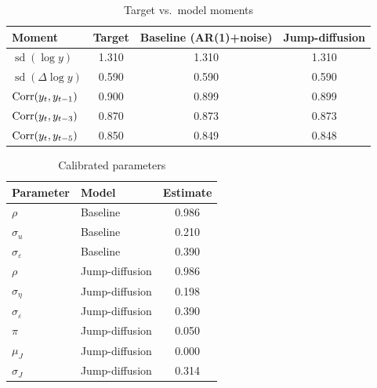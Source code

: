 
\begin{table}[H]
\centering
\caption{Target vs.\ model moments}
\label{tab:problem3-moments}
\begin{tabular}{lccc}
\toprule
Moment & Target & Baseline (AR(1)+noise) & Jump-diffusion \\
\midrule
$\operatorname{sd}(\log y)$ & 1.310 & 1.310 & 1.310 \\
$\operatorname{sd}(\Delta \log y)$ & 0.590 & 0.590 & 0.590 \\
$\operatorname{Corr}(y_t, y_{t-1})$ & 0.900 & 0.899 & 0.899 \\
$\operatorname{Corr}(y_t, y_{t-3})$ & 0.870 & 0.873 & 0.873 \\
$\operatorname{Corr}(y_t, y_{t-5})$ & 0.850 & 0.849 & 0.848 \\
\bottomrule
\end{tabular}
\end{table}

\begin{table}[H]
\centering
\caption{Calibrated parameters}
\label{tab:problem3-parameters}
\begin{tabular}{llc}
\toprule
Parameter & Model & Estimate \\
\midrule
$\rho$ & Baseline & 0.986 \\
$\sigma_u$ & Baseline & 0.210 \\
$\sigma_\varepsilon$ & Baseline & 0.390 \\
\midrule
$\rho$ & Jump-diffusion & 0.986 \\
$\sigma_\eta$ & Jump-diffusion & 0.198 \\
$\sigma_\varepsilon$ & Jump-diffusion & 0.390 \\
$\pi$ & Jump-diffusion & 0.050 \\
$\mu_J$ & Jump-diffusion & 0.000 \\
$\sigma_J$ & Jump-diffusion & 0.314 \\
\bottomrule
\end{tabular}
\end{table}

